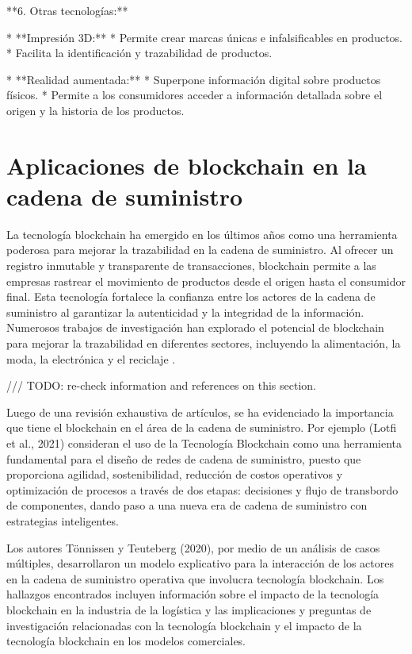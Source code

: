 \documentclass[main.tex]{subfiles}
\begin{document}
**6. Otras tecnologías:**

* **Impresión 3D:**
    * Permite crear marcas únicas e infalsificables en productos.
    * Facilita la identificación y trazabilidad de productos.

* **Realidad aumentada:**
    * Superpone información digital sobre productos físicos.
    * Permite a los consumidores acceder a información detallada sobre el origen y la historia de los productos.

\section{Aplicaciones de blockchain en la cadena de suministro}

La tecnología blockchain ha emergido en los últimos años como una herramienta poderosa para mejorar la trazabilidad en la cadena de suministro. Al ofrecer un registro inmutable y transparente de transacciones, blockchain permite a las empresas rastrear el movimiento de productos desde el origen hasta el consumidor final. Esta tecnología fortalece la confianza entre los actores de la cadena de suministro al garantizar la autenticidad y la integridad de la información. Numerosos trabajos de investigación han explorado el potencial de blockchain para mejorar la trazabilidad en diferentes sectores, incluyendo la alimentación, la moda, la electrónica y el reciclaje \cite{tang2024statistical, baralla2023waste}.

/// TODO: re-check information and references on this section.

Luego de una revisión exhaustiva de artículos, se ha evidenciado la importancia que tiene
el blockchain en el área de la cadena de suministro. Por ejemplo (Lotfi et al., 2021) consideran el
uso de la Tecnología Blockchain como una herramienta fundamental para el diseño de redes de
cadena de suministro, puesto que proporciona agilidad, sostenibilidad, reducción de costos
operativos y optimización de procesos a través de dos etapas: decisiones y flujo de transbordo de
componentes, dando paso a una nueva era de cadena de suministro con estrategias inteligentes.

Los autores Tönnissen y Teuteberg (2020), por medio de un análisis de casos múltiples,
desarrollaron un modelo explicativo para la interacción de los actores en la cadena de suministro
operativa que involucra tecnología blockchain. Los hallazgos encontrados incluyen información
sobre el impacto de la tecnología blockchain en la industria de la logística y las implicaciones y
preguntas de investigación relacionadas con la tecnología blockchain y el impacto de la tecnología
blockchain en los modelos comerciales.
\end{document}
